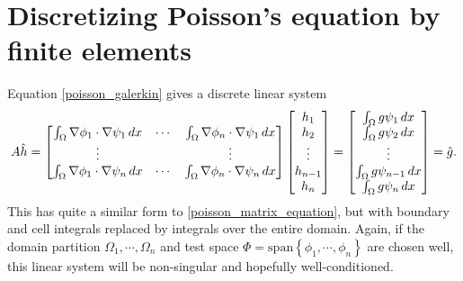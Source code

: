 % 
% 

\section{Discretizing Poisson's equation by finite elements}

Equation \eqref{poisson_galerkin} gives a discrete linear system
\renewcommand{\integralentry}[2]{\int_{\Omega}\nabla\phi_{#2} \cdot \nabla\psi_{#1}\,dx}
\begin{equation}\label{poisson_fem_matrix_equation}
    A\hat{h} = \begin{bmatrix}
            \integralentry{1}{1} & \cdots & \integralentry{1}{n} \\
            \vdots & & \vdots \\
            \integralentry{n}{1} & \cdots & \integralentry{n}{n}
            \end{bmatrix}
    \begin{bmatrix} h_1 \\ h_2 \\ \vdots \\ h_{n-1} \\ h_n \end{bmatrix}
    =
    \begin{bmatrix} \int_{\om}g\psi_1\,dx \\ \int_{\om}g\psi_2\,dx \\ \vdots \\ \int_{\om}g\psi_{n-1}\,dx \\ \int_{\om}g\psi_{n}\,dx \end{bmatrix}
    = \hat{g}.
\end{equation}
This has quite a similar form to \eqref{poisson_matrix_equation}, but with boundary and cell integrals replaced by integrals over the entire
domain.
Again, if the domain partition $\Omega_1,\cdots,\Omega_n$ and test space $\Phi = \text{span}\left\{\phi_1,\cdots,\phi_n\right\}$
are chosen well, this linear system will be non-singular and hopefully well-conditioned.

